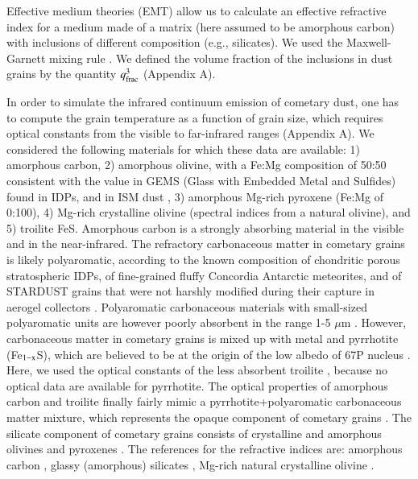 \documentclass[a4paper,fleqn,usenatbib]{mnras}
\begin{document}
Effective medium theories (EMT) allow us to calculate an effective
refractive index for a medium made of a matrix (here assumed to be
amorphous carbon) with inclusions of different composition (e.g.,
silicates). We used the Maxwell-Garnett
mixing rule \citep{MG1904}. We defined the volume
fraction of the inclusions in dust grains by the quantity $q_{\rm
frac}^3$ (Appendix A). 


In order to simulate the infrared continuum emission of cometary
dust, one has to compute the grain temperature as a function of
grain size, which requires  optical constants from the visible to
far-infrared ranges (Appendix A). We considered the following
materials for which these data are available: 1) amorphous carbon,
2) amorphous olivine, with a Fe:Mg composition of 50:50
consistent with the value in GEMS (Glass with Embedded Metal and
Sulfides) found in IDPs, and in ISM dust \citep{Keller2011}, 3)
amorphous Mg-rich pyroxene (Fe:Mg of 0:100), 4) Mg-rich
crystalline olivine (spectral indices from a natural olivine), and
5) troilite FeS. Amorphous carbon is a strongly absorbing material
in the visible and in the near-infrared. The refractory
carbonaceous matter in cometary grains is likely polyaromatic,
according to the known composition of chondritic porous
stratospheric IDPs, of fine-grained fluffy Concordia Antarctic
meteorites, and of STARDUST grains that were not harshly modified
during their capture in aerogel collectors \citep[][De Gregorio,
personal communication]{Sandford2006, Dobrica2011}. Polyaromatic
carbonaceous materials with small-sized polyaromatic units are
however poorly absorbent in the range 1-5 $\mu$m
\citep{Quirico2016}. However, carbonaceous matter in cometary
grains is mixed up with metal and pyrrhotite (Fe$_{\rm 1-x}$S),
which are believed to be at the origin of the low albedo of 67P
nucleus \citep{Capaccioni2015,Rousseau2017}. Here, we used the
optical constants of the less absorbent troilite \citep[][and
references therein]{Henning1996}, because no optical data are
available for pyrrhotite. The optical properties of amorphous
carbon and troilite finally fairly mimic a pyrrhotite+polyaromatic
carbonaceous matter mixture, which represents the opaque component
of cometary grains \citep[see][]{Engrand2016}. The silicate
component of cometary grains consists of crystalline and amorphous
olivines and pyroxenes
\citep{Wooden1999,Dobrica2011,Dobrica2012,Engrand2016}. The references for the
refractive indices are: amorphous carbon \citep{Edoh1983}, glassy
(amorphous) silicates \citep[namely MgSiO$_3$ pyroxene, and
MgFeSiO$_4$ olivine,][]{Dorschner1995}, Mg-rich natural
crystalline olivine \citep{Fabian2001}.
\end{document}
